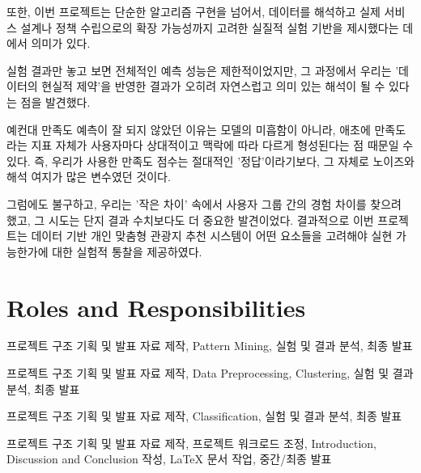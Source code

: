 \documentclass[sigconf]{acmart}
\begin{document}
\begin{CJK}{UTF8}{mj}
또한, 이번 프로젝트는 단순한 알고리즘 구현을 넘어서, 데이터를 해석하고 실제 서비스 설계나 정책 수립으로의 확장 가능성까지 고려한 실질적 실험 기반을 제시했다는 데에서 의미가 있다.

실험 결과만 놓고 보면 전체적인 예측 성능은 제한적이었지만, 그 과정에서 우리는 '데이터의 현실적 제약'을 반영한 결과가 오히려 자연스럽고 의미 있는 해석이 될 수 있다는 점을 발견했다.

예컨대 만족도 예측이 잘 되지 않았던 이유는 모델의 미흡함이 아니라, 애초에 만족도라는 지표 자체가 사용자마다 상대적이고 맥락에 따라 다르게 형성된다는 점 때문일 수 있다. 즉, 우리가 사용한 만족도 점수는 절대적인 '정답'이라기보다, 그 자체로 노이즈와 해석 여지가 많은 변수였던 것이다.

그럼에도 불구하고, 우리는 '작은 차이' 속에서 사용자 그룹 간의 경험 차이를 찾으려 했고, 그 시도는 단지 결과 수치보다도 더 중요한 발견이었다. 결과적으로 이번 프로젝트는 데이터 기반 개인 맞춤형 관광지 추천 시스템이 어떤 요소들을 고려해야 실현 가능한가에 대한 실험적 통찰을 제공하였다.


\section{Roles and Responsibilities}
\begin{description}[style=nextline]
  \item[정원홍] 프로젝트 구조 기획 및 발표 자료 제작, Pattern Mining, 실험 및 결과 분석, 최종 발표
  \item[박지원] 프로젝트 구조 기획 및 발표 자료 제작, Data Preprocessing, Clustering, 실험 및 결과 분석, 최종 발표
  \item[최윤재] 프로젝트 구조 기획 및 발표 자료 제작, Classification, 실험 및 결과 분석, 최종 발표
  \item[우혜민] 프로젝트 구조 기획 및 발표 자료 제작, 프로젝트 워크로드 조정, Introduction, Discussion and Conclusion 작성, LaTeX 문서 작업, 중간/최종 발표
\end{description}


\end{CJK}
\end{document}
